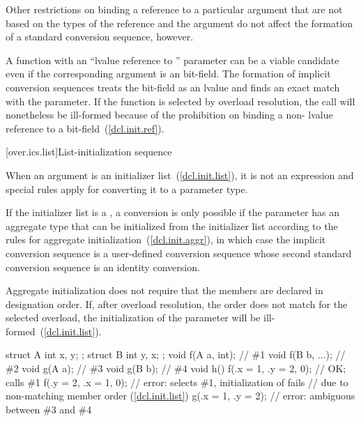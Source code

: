 \pnum
Other restrictions on binding a reference to a particular argument
that are not based on the types of the reference and the argument
do not affect the formation of a standard conversion
sequence, however.
\begin{example}
A function with an ``lvalue reference to '' parameter can
be a viable candidate even if the corresponding argument is an
bit-field.
The formation of implicit conversion sequences
treats the
bit-field as an
lvalue and finds an exact
match with the parameter.
If the function is selected by overload
resolution, the call will nonetheless be ill-formed because of
the prohibition on binding a non- lvalue reference to a bit-field~(\ref{dcl.init.ref}).
\end{example}

[over.ics.list]{List-initialization sequence}

\pnum
When an argument is an initializer list~(\ref{dcl.init.list}), it is not an
expression and special rules apply for converting it to a parameter type.

\pnum
If the initializer list is a ,
a conversion is only possible if
the parameter has an aggregate type
that can be initialized from the initializer list
according to the rules for aggregate initialization~(\ref{dcl.init.aggr}),
in which case the implicit conversion sequence is
a user-defined conversion sequence
whose second standard conversion sequence
is an identity conversion.
\begin{note}
Aggregate initialization does not require that
the members are declared in designation order.
If, after overload resolution, the order does not match
for the selected overload,
the initialization of the parameter will be ill-formed~(\ref{dcl.init.list}).
\begin{example}
\begin{codeblock}
struct A { int x, y; };
struct B { int y, x; };
void f(A a, int);          // \#1
void f(B b, ...);          // \#2
void g(A a);               // \#3
void g(B b);               // \#4
void h() {
  f({.x = 1, .y = 2}, 0);  // OK; calls \#1
  f({.y = 2, .x = 1}, 0);  // error: selects \#1, initialization of  fails
                           // due to non-matching member order (\ref{dcl.init.list})
  g({.x = 1, .y = 2});     // error: ambiguous between \#3 and \#4
}
\end{codeblock}
\end{example}
\end{note}

